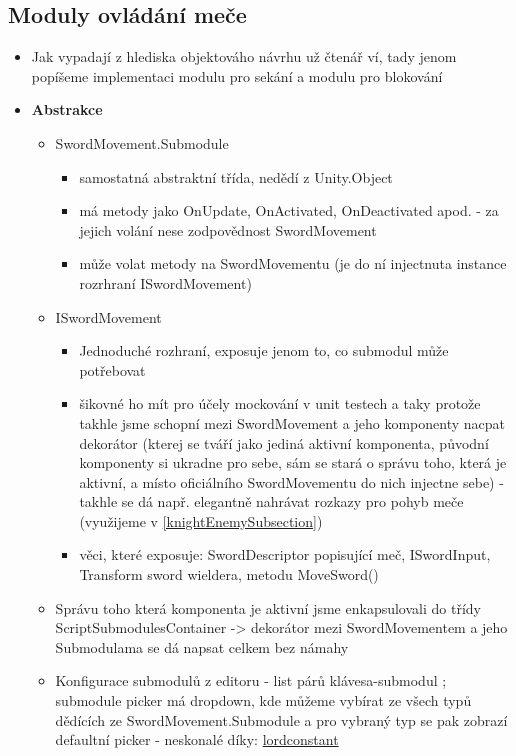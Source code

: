 \subsection{Moduly ovládání meče} \label{modesOfSwordMovementSubsection}
\begin{itemize}
  \item Jak vypadají z hlediska objektováho návrhu už čtenář ví, tady jenom popíšeme implementaci modulu pro sekání a modulu pro blokování
  \item \textbf{Abstrakce} 
    \begin{itemize}
      \item SwordMovement.Submodule
        \begin{itemize}
          \item samostatná abstraktní třída, nedědí z Unity.Object
          \item má metody jako OnUpdate, OnActivated, OnDeactivated apod. - za jejich volání nese zodpovědnost SwordMovement
          \item může volat metody na SwordMovementu (je do ní injectnuta instance rozrhraní ISwordMovement)
        \end{itemize}
      \item ISwordMovement
        \begin{itemize}
          \item Jednoduché rozhraní, exposuje jenom to, co submodul může potřebovat
          \item šikovné ho mít pro účely mockování v unit testech a taky protože takhle jsme schopní mezi SwordMovement a jeho komponenty nacpat dekorátor (kterej se tváří jako jediná aktivní komponenta, původní komponenty si ukradne pro sebe, sám se stará o správu toho, která je aktivní, a místo oficiálního SwordMovementu do nich injectne sebe) - takhle se dá např. elegantně nahrávat rozkazy pro pohyb meče (využijeme v \ref{knightEnemySubsection})
          \item věci, které exposuje: SwordDescriptor popisující meč, ISwordInput, Transform sword wieldera, metodu MoveSword()
        \end{itemize}
      \item Správu toho která komponenta je aktivní jsme enkapsulovali do třídy ScriptSubmodulesContainer -> dekorátor mezi SwordMovementem a jeho Submodulama se dá napsat celkem bez námahy
      \item Konfigurace submodulů z editoru - list párů klávesa-submodul ; submodule picker má dropdown, kde můžeme vybírat ze všech typů dědících ze SwordMovement.Submodule a pro vybraný typ se pak zobrazí defaultní picker - neskonalé díky: \href{https://github.com/lordconstant/SubclassPropertyDrawer}{lordconstant}

\end{itemize}
\end{itemize}
